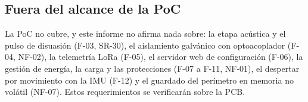 \subsection{Fuera del alcance de la PoC}

La PoC no cubre, y este informe no afirma nada sobre: la etapa acústica y el pulso de disuasión
(F-03, SR-30), el aislamiento galvánico con optoacoplador (F-04, NF-02), la telemetría LoRa
(F-05), el servidor web de configuración (F-06), la gestión de energía, la carga y las
protecciones (F-07 a F-11, NF-01), el despertar por movimiento con la IMU (F-12) y el guardado
del perímetro en memoria no volátil (NF-07). Estos requerimientos se verificarán sobre la PCB.
